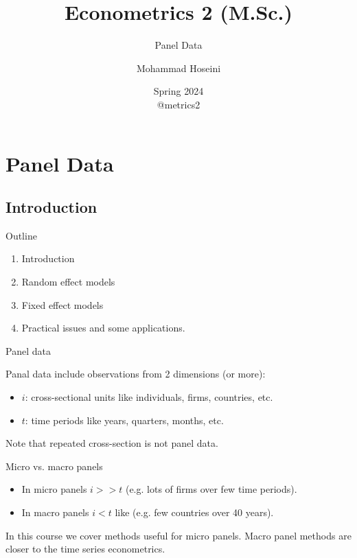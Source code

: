 \documentclass{beamer}
\begin{document}
	\title[Econometrics 2]{Econometrics 2 (M.Sc.)}
	\subtitle{Panel Data}
	\author[Mohammad Hoseini]{Mohammad Hoseini}
	
	
	\date[Spring 2024]{Spring 2024 \\
	\vspace{10pt} @metrics2
}
	
\begin{frame}[plain]
	\titlepage
\end{frame}

\section{Panel Data}
\subsection{Introduction}

\begin{frame}{Outline}

\begin{enumerate}
	\item Introduction
	\item Random effect models
	\item Fixed effect models
	\item Practical issues and some applications.
\end{enumerate}\bigskip


\end{frame}

\begin{frame}{Panel data}

Panal data include observations from 2 dimensions (or more):
\begin{itemize}
\item $i$: cross-sectional units like individuals, firms, countries, etc.
\item $t$: time periods like years, quarters, months, etc.
\end{itemize}\medskip

Note that repeated cross-section is not panel data.\bigskip

Micro vs. macro panels
\begin{itemize}
\item In micro panels $i>>t$ (e.g. lots of firms over few time periods).
\item In macro panels $i<t$ like (e.g. few countries over 40 years).
\end{itemize}
In this course we cover methods useful for micro panels. Macro panel methods are closer to the time series econometrics. 
\end{frame}
\end{document}

